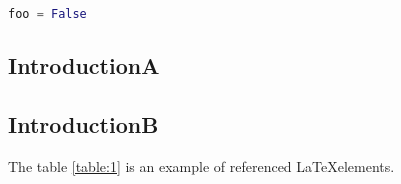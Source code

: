 \begin{lstlisting}[language=Python, caption=FooBar]
foo = False
\end{lstlisting}



\subsection{IntroductionA}
\subsection{IntroductionB}
The table \ref{table:1} is an example of referenced \LaTeX elements.\\
